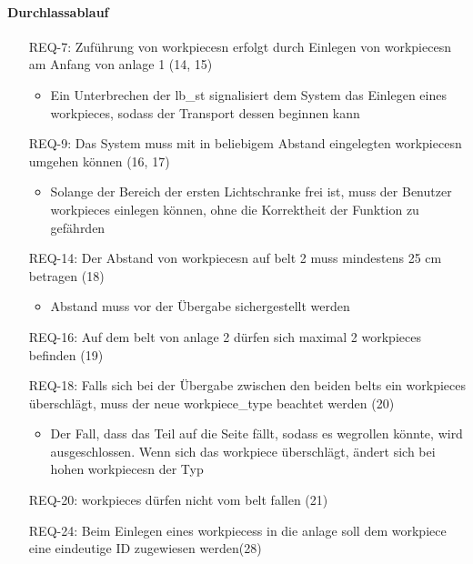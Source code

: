 \paragraph{Durchlassablauf}
\begin{itemize}
    \item[REQ-7:] Zuführung von \glspl{workpiece}n erfolgt durch Einlegen von \glspl{workpiece}n am Anfang von \gls{anlage} 1 (14, 15)
    \begin{itemize}
        \item Ein Unterbrechen der \gls{lb_st} signalisiert dem System das Einlegen eines \gls{workpiece}s,
        sodass der Transport dessen beginnen kann
    \end{itemize}
    \item[REQ-9:] Das System muss mit in beliebigem Abstand eingelegten \glspl{workpiece}n umgehen können (16, 17) %
    \begin{itemize}
        \item Solange der Bereich der ersten Lichtschranke frei ist, muss der Benutzer \glspl{workpiece}
        einlegen können, ohne die Korrektheit der Funktion zu gefährden
    \end{itemize}
    \item[REQ-14:] Der Abstand von \glspl{workpiece}n auf \gls{belt} 2 muss mindestens 25 cm betragen (18)
    \begin{itemize}
        \item Abstand muss vor der Übergabe sichergestellt werden
    \end{itemize}
    \item[REQ-16:] Auf dem \gls{belt} von \gls{anlage} 2 dürfen sich maximal 2 \glspl{workpiece} befinden (19)
    \item[REQ-18:] Falls sich bei der Übergabe zwischen den beiden \glspl{belt} ein \glspl{workpiece}
    überschlägt, muss der neue \gls{workpiece_type} beachtet werden (20)
    \begin{itemize}
        \item Der Fall, dass das Teil auf die Seite fällt, sodass es wegrollen könnte, wird ausgeschlossen.
        Wenn sich das \gls{workpiece} überschlägt, ändert sich bei hohen \glspl{workpiece}n der Typ
    \end{itemize}
    \item[REQ-20:] \glspl{workpiece} dürfen nicht vom \gls{belt} fallen (21)
    \item[REQ-24:] Beim Einlegen eines \glspl{workpiece}s in die \gls{anlage} soll dem \gls{workpiece} eine eindeutige ID zugewiesen werden(28)

\end{itemize}
